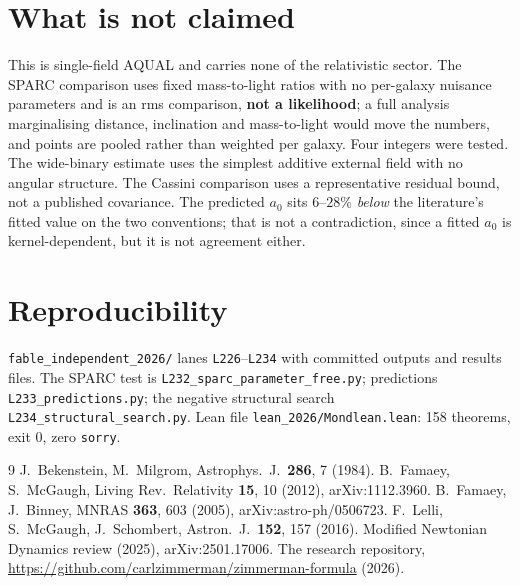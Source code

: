 \documentclass[11pt,letterpaper]{article}
\begin{document}
\section{What is not claimed}
This is single-field AQUAL and carries none of the relativistic sector. The SPARC comparison uses fixed mass-to-light ratios with no per-galaxy nuisance parameters and is an rms comparison, \textbf{not a likelihood}; a full analysis marginalising distance, inclination and mass-to-light would move the numbers, and points are pooled rather than weighted per galaxy. Four integers were tested. The wide-binary estimate uses the simplest additive external field with no angular structure. The Cassini comparison uses a representative residual bound, not a published covariance. The predicted $a_0$ sits $6$--$28\%$ \emph{below} the literature's fitted value on the two conventions; that is not a contradiction, since a fitted $a_0$ is kernel-dependent, but it is not agreement either.

\section{Reproducibility}
\texttt{fable\_independent\_2026/} lanes \texttt{L226}--\texttt{L234} with committed outputs and results files. The SPARC test is \texttt{L232\_sparc\_parameter\_free.py}; predictions \texttt{L233\_predictions.py}; the negative structural search \texttt{L234\_structural\_search.py}. Lean file \texttt{lean\_2026/Mondlean.lean}: 158 theorems, exit 0, zero \texttt{sorry}.

\begin{thebibliography}{9}
 J.~Bekenstein, M.~Milgrom, Astrophys.\ J.\ \textbf{286}, 7 (1984).
 B.~Famaey, S.~McGaugh, Living Rev.\ Relativity \textbf{15}, 10 (2012), arXiv:1112.3960.
 B.~Famaey, J.~Binney, MNRAS \textbf{363}, 603 (2005), arXiv:astro-ph/0506723.
 F.~Lelli, S.~McGaugh, J.~Schombert, Astron.\ J.\ \textbf{152}, 157 (2016).
 Modified Newtonian Dynamics review (2025), arXiv:2501.17006.
 The research repository, \url{https://github.com/carlzimmerman/zimmerman-formula} (2026).
\end{thebibliography}
\end{document}
